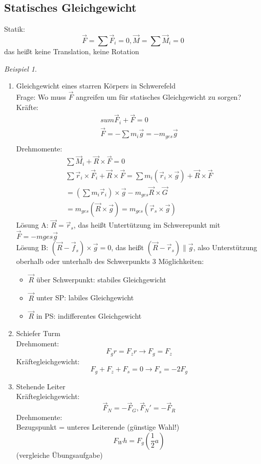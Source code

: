 \documentclass[a4paper]{scrartcl}
\renewcommand{\v}[1]{\vec{#1}}
\theoremstyle{definition}
\theoremstyle{plain}
\theoremstyle{plain}
\theoremstyle{remark}
\theoremstyle{remark}
\theoremstyle{remark}
\newtheorem{ex}{Beispiel}
\begin{document}
\subsection{Statisches Gleichgewicht}
\label{sec-8-3}
Statik:
\[\v F = \sum \v F_i = 0, \v M = \sum \v M_i = 0\]
das heißt keine Translation, keine Rotation
\begin{ex}
\mbox{}
\begin{enumerate}
\item Gleichgewicht eines starren Körpers in Schwerefeld \\
     Frage: Wo muss $\v F$ angreifen um für statisches Gleichgewicht zu sorgen? \\
     Kräfte:
\begin{align*}
sum \v F_i + \v F = 0 \\
\v F = - \sum m_i \v g = - m_{ges} \v g \\
\end{align*}
Drehmomente:
\begin{align*}
\sum \v M_i + \v R \times \v F = 0 \\
\sum \v r_i \times \v F_i + \v R \times \v F = \sum m_i (\v r_i \times \v g) + \v R \times \v F \\
= (\sum m_i \v r_i) \times \v g - m_{ges} \v R \times \v G \\
= m_{ges} (\v R \times \v g) = m_{ges} (\v r_s \times \v g)
\end{align*}
Lösung A: $\v R = \v r_s$, das heißt Untertützung im Schwerepunkt mit $\v F = - m{ges} \v g$ \\
     Lösung B: $(\v R - \v f_s) \times \v g = 0$, das heißt $(\v R - \v r_s) \parallel \v g$, also Unterstützung oberhalb oder unterhalb des Schwerpunkts
3 Möglichkeiten:
\begin{itemize}
\item $\v R$ über Schwerpunkt: stabiles Gleichgewicht
\item $\v R$ unter SP: labiles Gleichgewicht
\item $\v R$ in PS: indifferentes Gleichgewicht
\end{itemize}
\item Schiefer Turm \\
      Drehmoment:
\[F_g r = F_z r \rightarrow F_g = F_z\]
Kräftegleichgewicht:
\[F_g + F_z + F_s = 0 \rightarrow F_s = -2F_g\]
\item Stehende Leiter \\
      Kräftegleichgewicht:
\[\v F_N = - \v F_G, \v F_N' = -\v F_R\]
Drehmomente: \\
      Bezugspunkt = unteres Leiterende (günstige Wahl!) \\
      \[F_W h = F_g (\frac{1}{2} a)\]
(vergleiche Übungsaufgabe)
\end{enumerate}
\end{ex}
\end{document}
